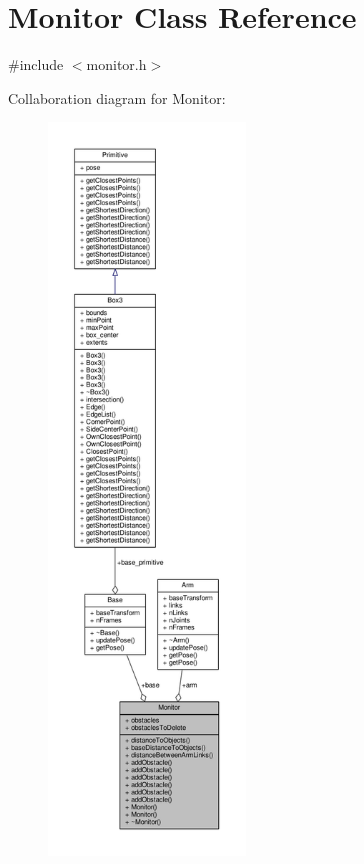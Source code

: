 \hypertarget{class_monitor}{}\section{Monitor Class Reference}
\label{class_monitor}


{\ttfamily \#include $<$monitor.\+h$>$}



Collaboration diagram for Monitor\+:
\nopagebreak
\begin{figure}[H]
\begin{center}
\leavevmode
\includegraphics[height=550pt]{class_monitor__coll__graph}
\end{center}
\end{figure}
